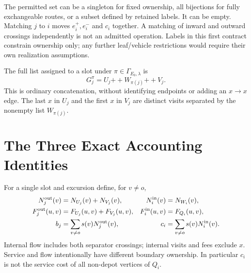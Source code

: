 \documentclass[11pt]{article}
\theoremstyle{remark}
\newcommand{\cat}{\mathbin{+\!+}}
\begin{document}
The permitted set can be a singleton for fixed ownership, all bijections for
fully exchangeable routes, or a subset defined by retained labels. It can be
empty. Matching $j$ to $i$ moves $e_i^+,e_i^-$ and $c_i$ together. A matching of
inward and outward crossings independently is not an admitted operation.
Labels in this first contract constrain ownership only; any further
leaf/vehicle restrictions would require their own realization assumptions.

The full list assigned to a slot under $\pi\in\Gamma_{E_0,\lambda}$ is
\begin{equation}\label{eq:gluelist}
 G_j^\pi=U_j\cat W_{\pi(j)}\cat V_j.
\end{equation}
This is ordinary concatenation, without identifying endpoints or adding an
$x\to x$ edge. The last $x$ in $U_j$ and the first $x$ in $V_j$ are distinct
visits separated by the nonempty list $W_{\pi(j)}$.

\section{The Three Exact Accounting Identities}
\label{sec:identities}

For a single slot and excursion define, for $v\ne o$,
\begin{align*}
 N_j^{\rm out}(v)&=N_{U_j}(v)+N_{V_j}(v),&
 N_i^{\rm in}(v)&=N_{W_i}(v),\\
 F_j^{\rm out}(u,v)&=F_{U_j}(u,v)+F_{V_j}(u,v),&
 F_i^{\rm in}(u,v)&=F_{Q_i}(u,v),\\
 b_j&=\sum_{v\ne o}s(v)N_j^{\rm out}(v),&
 c_i&=\sum_{v\ne o}s(v)N_i^{\rm in}(v).
\end{align*}
Internal flow includes both separator crossings; internal visits and fees
exclude $x$. Service and flow intentionally have different boundary ownership.
In particular $c_i$ is not the service cost of all non-depot vertices of $Q_i$.
\end{document}
